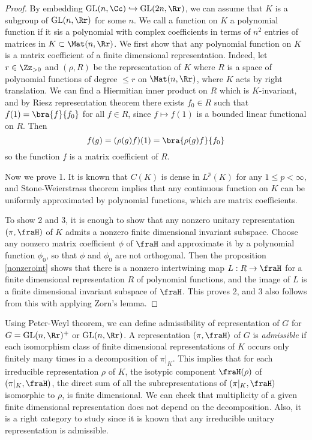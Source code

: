 \begin{proof}
By embedding $\GL(n, \Cc)\hookrightarrow \GL(2n, \Rr)$, we can assume that $K$ is a subgroup of $\GL(n, \Rr)$ for some $n$. We call a function on $K$ a polynomial function if it sis a polynomial with complex coefficients in terms of $n^{2}$ entries of matrices in $K\subset \Mat(n, \Rr)$. We first show that any polynomial function on $K$ is a matrix coefficient of a finite dimensional representation. 
Indeed, let $r\in \Zz_{>0}$ and $(\rho, R)$ be the representation of $K$ where $R$ is a space of polynomial functions of degree $\leq r$ on $\Mat(n, \Rr)$, where $K$ acts by right translation. 
We can find a Hiermitian inner product on $R$ which is $K$-invariant, and by Riesz representation theorem there exists $f_{0}\in R$ such that $f(1) = \bra{f}{f_{0}}$ for all $f\in R$, since $f\mapsto f(1)$ is a bounded linear functional on $R$. Then 
$$
f(g) = (\rho(g)f)(1) = \bra{\rho(g)f}{f_{0}}
$$
so the function $f$ is a matrix coefficient of $R$. 

Now we prove 1. It is known that $C(K)$ is dense in $L^{p}(K)$ for any $1\leq p <\infty$, and Stone-Weierstrass theorem implies that any continuous function on $K$ can be uniformly approximated by polynomial functions, which are matrix coefficients. 

To show 2 and 3, it is enough to show that any nonzero unitary representation $(\pi, \fraH)$ of $K$ admits a nonzero finite dimensional invariant subspace. 
Choose any nonzero matrix coefficient $\phi$ of $\fraH$ and approximate it by a polynomial function $\phi_{0}$, so that $\phi$ and $\phi_{0}$ are not orthogonal. Then the proposition \ref{nonzeroint} shows that there is a nonzero intertwining map $L:R\to \fraH$ for a finite dimensional representation $R$ of polynomial functions, and the image of $L$ is a finite dimensional invariant subspace of $\fraH$. 
This proves 2, and 3 also follows from this with applying Zorn's lemma. 
\end{proof}

Using Peter-Weyl theorem, we can define admissibility of representation of $G$ for $G = \GL(n, \Rr)^{+}$ or $\GL(n,\Rr)$. 
A representation $(\pi, \fraH)$ of $G$ is \emph{admissible} if each isomorphism class of finite dimensional representations of $K$ occurs only finitely many times in a decomposition of $\pi|_{K}$. 
This implies that for each irreducible representation $\rho$ of $K$, the isotypic component $\fraH(\rho)$ of $(\pi|_{K}, \fraH)$, the direct sum of all the subrepresentations of $(\pi|_{K}, \fraH)$ isomorphic to $\rho$, is finite dimensional. 
We can check that multiplicity of a given finite dimensional representation does not depend on the decomposition. 
Also, it is a right category to study since it is known that any irreducible unitary representation is admissible. 

